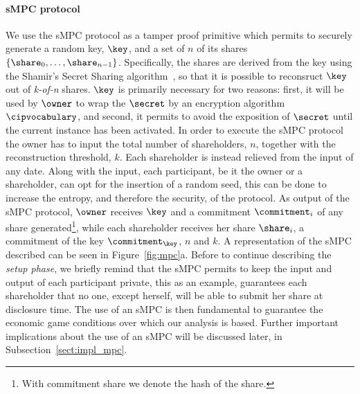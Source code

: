 \paragraph{sMPC protocol}\label{sect:impl_mpc_brief}
We use the sMPC protocol as a tamper proof primitive which permits to securely generate a random key, $\key$, and a set of $n$ of its shares $\left\lbrace \share _0 , \ldots , \share_{n-1} 	\right\rbrace$. Specifically, the shares are derived from the key using the Shamir's Secret Sharing algorithm~\cite{Shamir:1979:SS:359168.359176}, so that it is possible to reconsruct $\key$ out of {\em k-of-n} shares.
$\key$ is primarily necessary for two reasons: first, it will be used by $\owner$ to wrap the $\secret$ by an encryption algorithm $\cipvocabulary$, and second, it permits to avoid the exposition of $\secret$ until the current \shortname instance has been activated.  
\newline
In order to execute the sMPC protocol the owner has to input the total number of shareholders, $n$, together with the reconstruction threshold, $k$. Each shareholder is instead relieved from the input of any date. Along with the input, each participant, be it the owner or a shareholder, can opt for the insertion of a random seed, this can be done to increase the entropy, and therefore the security, of the protocol. As output of the sMPC protocol, $\owner$ receives $\key$ and a commitment $\commitment _i$ of any share generated\footnote{With commitment share we denote the hash of the share.}, while each shareholder receives her share $\share_{i}$, a commitment of the key $ \commitment _ \key $, $n$ and $k$. 
A representation of the sMPC described can be seen in Figure~\ref{fig:mpc}a. 
\newline
Before to continue describing the {\em setup phase}, we briefly remind that the sMPC permits to keep the input and output of each participant private, this as an example, guarantees each shareholder that no one, except herself, will be able to submit her share at disclosure time. The use of an sMPC is then fundamental to guarantee the economic game conditions over which our analysis is based. Further important implications about the use of an sMPC will be discussed later, in Subsection~\ref{sect:impl_mpc}.

